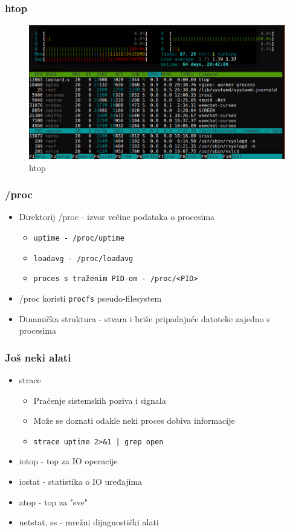 \documentclass[t,table,usenames,dvipsnames]{beamer}
\newcommand{\shell}[1]{\texttt{#1}}
\begin{document}
\begin{frame}
    \frametitle{htop}
    \begin{figure}
        \centering
        \includegraphics[width=1.0\linewidth]{htop-marvin}
        \caption{htop}
        \label{fig:htop-marvin}
    \end{figure}
\end{frame}

\begin{frame}
    \frametitle{/proc}
    \begin{itemize}
        \item Direktorij /proc - izvor većine podataka o procesima
        \begin{itemize}
            \item \shell{uptime - /proc/uptime}
            \item \shell{loadavg - /proc/loadavg}
            \item \shell{proces s traženim PID-om - /proc/\textless PID\textgreater}
        \end{itemize}
        \item /proc koristi \shell{procfs} pseudo-filesystem
        \item Dinamička struktura - stvara i briše pripadajuće datoteke zajedno s procesima
    \end{itemize}
\end{frame}

\begin{frame}
    \frametitle{Još neki alati}
    \begin{itemize}
        \item strace 
        \begin{itemize}
            \item Praćenje sistemskih poziva i signala
            \item Može se doznati odakle neki proces dobiva informacije
            \item \shell{strace uptime 2\textgreater\&1 | grep open} \\
        \end{itemize}
        \item iotop - top za IO operacije
        \item iostat - statistika o IO uređajima
        \item atop - top za "sve"
        \item netstat, ss - mrežni dijagnostički alati
    \end{itemize}
\end{frame}
\end{document}
